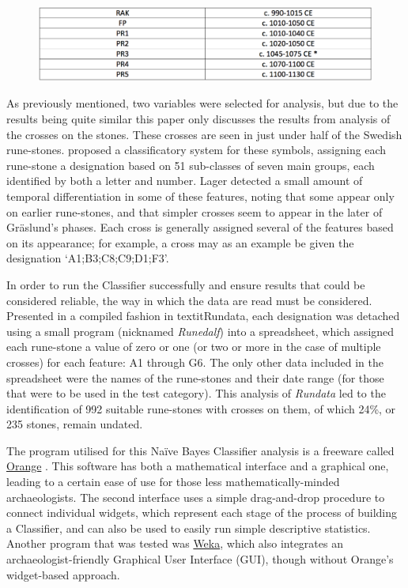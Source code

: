 	\begin{figure}[!htb]
		\includegraphics[width=.95\linewidth]{figures/thoeming_Table4}
		\centering
		\label{fig:Table4}
	\end{figure}

As previously mentioned, two variables were selected for analysis, but due to the results being quite similar this paper only discusses the results from analysis of the crosses on the stones. These crosses are seen in just under half of the Swedish rune-stones. \textcite{Lager_2002} proposed a classificatory system for these symbols, assigning each rune-stone a designation based on 51 sub-classes of seven main groups, each identified by both a letter and number. Lager detected a small amount of temporal differentiation in some of these features, noting that some appear only on earlier rune-stones, and that simpler crosses seem to appear in the later of Gräslund’s phases. Each cross is generally assigned several of the features based on its appearance; for example, a cross may as an example be given the designation ‘A1;B3;C8;C9;D1;F3’. 

In order to run the Classifier successfully and ensure results that could be considered reliable, the way in which the data are read must be considered. Presented in a compiled fashion in textit{Rundata}, each designation was detached using a small program (nicknamed \textit{Runedalf}) into a spreadsheet, which assigned each rune-stone a value of zero or one (or two or more in the case of multiple crosses) for each feature: A1 through G6. The only other data included in the spreadsheet were the names of the rune-stones and their date range (for those that were to be used in the test category). This analysis of \textit{Rundata} led to the identification of 992 suitable rune-stones with crosses on them, of which 24\%, or 235 stones, remain undated. 

The program utilised for this Naïve Bayes Classifier analysis is a freeware called \href{http://orange.biolab.si/}{Orange} \parencite{Demsar_2004}. This software has both a mathematical interface and a graphical one, leading to a certain ease of use for those less mathematically-minded archaeologists. The second interface uses a simple drag-and-drop procedure to connect individual widgets, which represent each stage of the process of building a Classifier, and can also be used to easily run simple descriptive statistics. Another program that was tested was \href{http://www.cs.waikato.ac.nz/ml/weka/}{Weka}, which also integrates an archaeologist-friendly Graphical User Interface (GUI), though without Orange’s widget-based approach.

